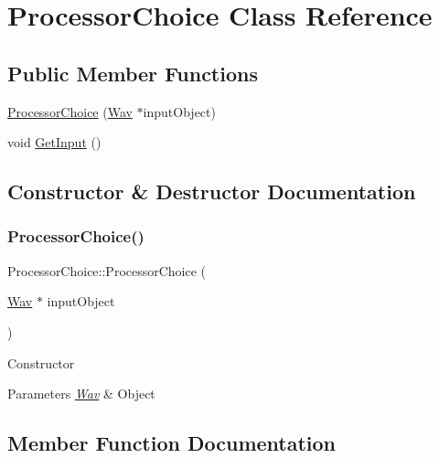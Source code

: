 \hypertarget{classProcessorChoice}{}\section{Processor\+Choice Class Reference}
\label{classProcessorChoice}
\subsection*{Public Member Functions}
\begin{DoxyCompactItemize}
\item 
\hyperlink{classProcessorChoice_ab21e498de95395cc614ed76ee8ab4158}{Processor\+Choice} (\hyperlink{classWav}{Wav} $\ast$input\+Object)
\item 
void \hyperlink{classProcessorChoice_a8cbc469e78083cfc9a90303b6210208e}{Get\+Input} ()
\end{DoxyCompactItemize}


\subsection{Constructor \& Destructor Documentation}
\mbox{\label{classProcessorChoice_ab21e498de95395cc614ed76ee8ab4158}} 
\subsubsection{\texorpdfstring{Processor\+Choice()}{ProcessorChoice()}}
{\footnotesize\ttfamily Processor\+Choice\+::\+Processor\+Choice (\begin{DoxyParamCaption}\item[{\hyperlink{classWav}{Wav} $\ast$}]{input\+Object }\end{DoxyParamCaption})\hspace{0.3cm}{\ttfamily [inline]}}

Constructor


\begin{DoxyParams}{Parameters}
{\em \hyperlink{classWav}{Wav}} & Object \\
\hline
\end{DoxyParams}


\subsection{Member Function Documentation}
\mbox{\label{classProcessorChoice_a8cbc469e78083cfc9a90303b6210208e}} 
